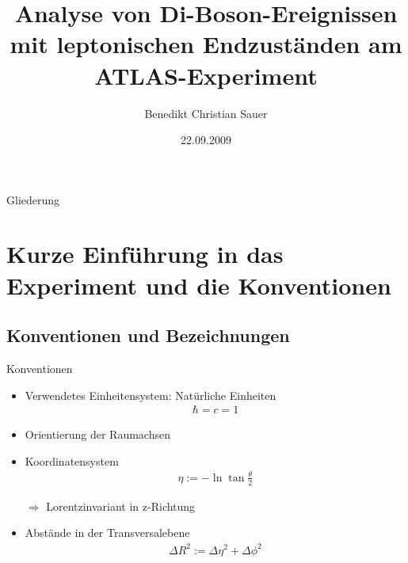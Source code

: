 \documentclass{beamer}
\title[Analyse von Di-Boson-Ereignissen]{Analyse von Di-Boson-Ereignissen mit
leptonischen Endzuständen am ATLAS-Experiment
}
\author[B. Sauer]{Benedikt Christian Sauer}
\institute{Bachelorarbeit am Physikalischen Institut der Universität Bonn}
\date{22.09.2009}
\begin{document}
\begin{frame}
  \titlepage
\end{frame}

\begin{frame}{Gliederung}
  \tableofcontents[pausesections]
\end{frame}

\section[Einführung]{Kurze Einführung in das Experiment und die Konventionen}
\subsection{Konventionen und Bezeichnungen}
\begin{frame}{Konventionen}
  \begin{itemize}
    \item Verwendetes Einheitensystem: Natürliche Einheiten
      \begin{align}
        \hbar = c = 1
      \end{align}
      \pause
    \item Orientierung der Raumachsen
      \pause
    \item Koordinatensystem
      \pause
      \begin{align}
        \eta := -\ln{\tan{\frac \theta 2}}
      \end{align}
    \item[$\Rightarrow$] Lorentzinvariant in z-Richtung
      \pause
    \item Abstände in der Transversalebene
      \begin{align}
        \Delta R^2 := \Delta\eta^2 + \Delta\phi^2
      \end{align}
  \end{itemize}
\end{frame}
\end{document}

